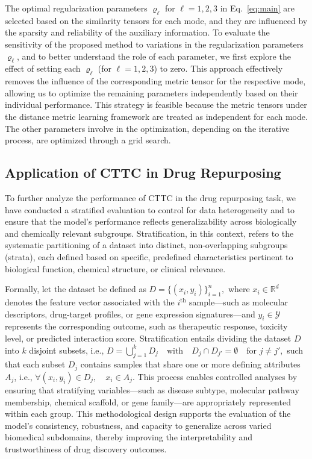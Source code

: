 \documentclass{article}
\begin{document}
The optimal regularization parameters $\varrho_\ell$ for $\ell = 1, 2, 3$ in Eq.~\eqref{eq:main} are selected based on the similarity tensors for each mode, and they are influenced by the sparsity and reliability of the auxiliary information. To evaluate the sensitivity of the proposed method to variations in the regularization parameters $\varrho_\ell$, and to better understand the role of each parameter, we first explore the effect of setting each $\varrho_\ell$ (for $\ell = 1, 2, 3$) to zero. This approach effectively removes the influence of the corresponding metric tensor for the respective mode, allowing us to optimize the remaining parameters independently based on their individual performance. This strategy is feasible because the metric tensors under the distance metric learning framework are treated as independent for each mode. The other parameters involve in the optimization, depending on the iterative process, are optimized through a grid search. 




\subsection{Application of CTTC in Drug Repurposing}\label{sec:application}




To further analyze the performance of CTTC in the drug repurposing task, we have conducted a stratified evaluation to control for data heterogeneity and to ensure that the model’s performance reflects generalizability across biologically and chemically relevant subgroups. Stratification, in this context, refers to the systematic partitioning of a dataset into distinct, non-overlapping subgroups (strata), each defined based on specific, predefined characteristics pertinent to biological function, chemical structure, or clinical relevance.

Formally, let the dataset be defined as
\(
D = \{(x_i, y_i)\}_{i=1}^{n},
\)
where \( x_i \in \mathbb{R}^d \) denotes the feature vector associated with the \(i^{\text{th}}\) sample—such as molecular descriptors, drug-target profiles, or gene expression signatures—and \( y_i \in \mathcal{Y} \) represents the corresponding outcome, such as therapeutic response, toxicity level, or predicted interaction score. Stratification entails dividing the dataset \(D\) into \(k\) disjoint subsets, i.e.,
\(
D = \bigcup_{j=1}^{k} D_j \quad \text{with} \quad D_j \cap D_{j'} = \emptyset \quad \text{for } j \ne j',
\)
such that each subset \(D_j\) contains samples that share one or more defining attributes \(A_j\), i.e.,
\(
\forall (x_i, y_i) \in D_j, \quad x_i \in A_j.
\)
This process enables controlled analyses by ensuring that stratifying variables—such as disease subtype, molecular pathway membership, chemical scaffold, or gene family—are appropriately represented within each group. This methodological design supports the evaluation of the model’s consistency, robustness, and capacity to generalize across varied biomedical subdomains, thereby improving the interpretability and trustworthiness of drug discovery outcomes.
\end{document}
